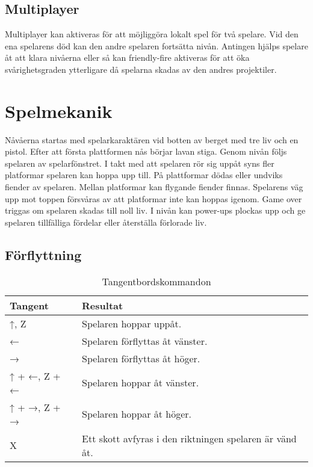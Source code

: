 \documentclass{TDP005mall}
\begin{document}
\subsection*{Multiplayer}
Multiplayer kan aktiveras för att möjliggöra lokalt spel för två spelare. Vid den ena spelarens död kan den andre spelaren fortsätta nivån. Antingen hjälps spelare åt att klara nivåerna eller så kan friendly-fire aktiveras för att öka svårighetsgraden ytterligare då spelarna skadas av den andres projektiler.

\section{Spelmekanik}%
Nåvåerna startas med spelarkaraktären vid botten av berget med tre liv och en pistol. Efter att första plattformen nås börjar lavan stiga. Genom nivån följs spelaren av spelarfönstret. I takt med att spelaren rör sig uppåt syns fler platformar spelaren kan hoppa upp till. På plattformar dödas eller undviks fiender av spelaren. Mellan platformar kan flygande fiender finnas. Spelarens väg upp mot toppen försvåras av att platformar inte kan hoppas igenom. Game over triggas om spelaren skadas till noll liv. I nivån kan power-ups plockas upp och ge spelaren tillfälliga fördelar eller återställa förlorade liv. 

\subsection{Förflyttning} %

\begin{table}[h!]
  \centering
  \caption{Tangentbordskommandon\label{tab:1}}
\begin{tabular}{|l|l|}
\hline
Tangent & Resultat \\\hline
↑, Z & Spelaren hoppar uppåt. \\\hline
← & Spelaren förflyttas åt vänster. \\\hline
→ & Spelaren förflyttas åt höger. \\\hline
↑ + ←, Z + ← & Spelaren hoppar åt vänster. \\\hline
↑ + →, Z + → & Spelaren hoppar åt höger. \\\hline
X & Ett skott avfyras i den riktningen spelaren är vänd åt. \\\hline
\end{tabular}
\end{table}
\end{document}

